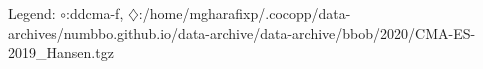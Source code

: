 Legend: {\color{NavyBlue}$\circ$}:ddcma-f, {\color{Magenta}$\diamondsuit$}:/home/mgharafixp/.cocopp/data-archives/numbbo.github.io/data-archive/data-archive/bbob/2020/CMA-ES-2019\_Hansen.tgz